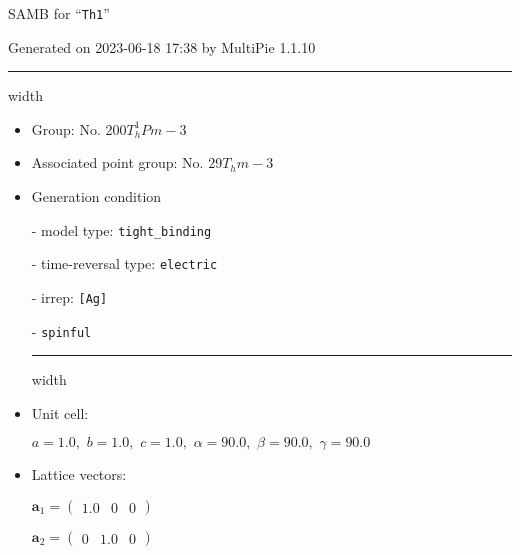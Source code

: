 \documentclass[fleqn,10pt,landscape]{article}
\begin{document}
\setcounter{MaxMatrixCols}{16}

\setlength{\baselineskip}{16pt}
\footnotesize
\begin{center}
\LARGE
SAMB for ``\texttt{Th1}''
\end{center}
\begin{flushright}
Generated on 2023-06-18 17:38 by MultiPie 1.1.10
\end{flushright}
\vspace{1cm}


 \hfil \hrule height 1mm width \textwidth \hfil

\begin{itemize}
\item Group: No. 200\quad$T_{h}^{1}$\quad$Pm-3$\quad[ cubic ]

\item Associated point group: No. 29\quad$T_{h}$\quad$m-3$\quad[ cubic ]

\vspace{5mm}

\item Generation condition

\quad - model type: \texttt{tight_binding}

\quad - time-reversal type: \texttt{electric}

\quad - irrep: \texttt{[Ag]}

\quad - \texttt{spinful}


 \hfil \hrule height 1mm width \textwidth \hfil

\item Unit cell:

\quad $a=1.0,\,\, b=1.0,\,\, c=1.0,\,\, \alpha=90.0,\,\, \beta=90.0,\,\, \gamma=90.0$

\item Lattice vectors:

\quad $\bm{a}_1=\begin{pmatrix} 1.0 & 0 & 0 \end{pmatrix}$

\quad $\bm{a}_2=\begin{pmatrix} 0 & 1.0 & 0 \end{pmatrix}$


\end{itemize}
\end{document}
